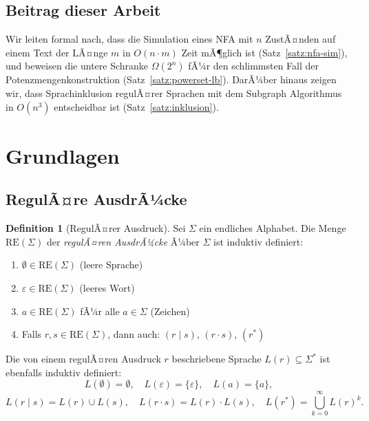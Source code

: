﻿\documentclass[a4paper,12pt]{article}
\theoremstyle{definition}
\newtheorem{definition}{Definition}
\begin{document}
\subsection{Beitrag dieser Arbeit}

Wir leiten formal nach, dass die Simulation eines NFA mit $n$ ZustÃ¤nden auf
einem Text der LÃ¤nge $m$ in $O(n \cdot m)$ Zeit mÃ¶glich ist (Satz~\ref{satz:nfa-sim}),
und beweisen die untere Schranke $\Omega(2^n)$ fÃ¼r den schlimmsten Fall der
Potenzmengenkonstruktion (Satz~\ref{satz:powerset-lb}). DarÃ¼ber hinaus zeigen
wir, dass Sprachinklusion regulÃ¤rer Sprachen mit dem Subgraph Algorithmus in
$O(n^3)$ entscheidbar ist (Satz~\ref{satz:inklusion}).

\section{Grundlagen}

\subsection{RegulÃ¤re AusdrÃ¼cke}

\begin{definition}[RegulÃ¤rer Ausdruck]
	Sei $\Sigma$ ein endliches Alphabet. Die Menge $\mathrm{RE}(\Sigma)$ der
	\emph{regulÃ¤ren AusdrÃ¼cke} Ã¼ber $\Sigma$ ist induktiv definiert:
	\begin{enumerate}
		\item $\emptyset \in \mathrm{RE}(\Sigma)$ (leere Sprache)
		\item $\varepsilon \in \mathrm{RE}(\Sigma)$ (leeres Wort)
		\item $a \in \mathrm{RE}(\Sigma)$ fÃ¼r alle $a \in \Sigma$ (Zeichen)
		\item Falls $r, s \in \mathrm{RE}(\Sigma)$, dann auch:
		      $(r \mid s)$, $(r \cdot s)$, $(r^*)$
	\end{enumerate}
\end{definition}

Die von einem regulÃ¤ren Ausdruck $r$ beschriebene Sprache $L(r) \subseteq \Sigma^*$
ist ebenfalls induktiv definiert:
\[
	L(\emptyset) = \emptyset,\quad
	L(\varepsilon) = \{\varepsilon\},\quad
	L(a) = \{a\},
\]
\[
	L(r \mid s) = L(r) \cup L(s),\quad
	L(r \cdot s) = L(r) \cdot L(s),\quad
	L(r^*) = \bigcup_{k=0}^{\infty} L(r)^k.
\]
\end{document}
